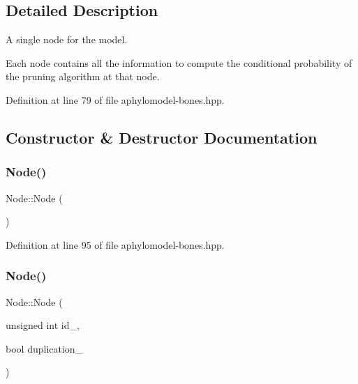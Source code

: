 

\subsection{Detailed Description}
A single node for the model. 

Each node contains all the information to compute the conditional probability of the pruning algorithm at that node. 

Definition at line 79 of file aphylomodel-\/bones.\+hpp.



\subsection{Constructor \& Destructor Documentation}
\mbox{\label{class_node_ad7a34779cad45d997bfd6d3d8043c75f}} 
\subsubsection{\texorpdfstring{Node()}{Node()}\hspace{0.1cm}{\footnotesize\ttfamily [1/3]}}
{\footnotesize\ttfamily Node\+::\+Node (\begin{DoxyParamCaption}{ }\end{DoxyParamCaption})\hspace{0.3cm}{\ttfamily [inline]}}



Definition at line 95 of file aphylomodel-\/bones.\+hpp.

\mbox{\label{class_node_affbe0c59bdcfd5e8068d50b49742cff6}} 
\subsubsection{\texorpdfstring{Node()}{Node()}\hspace{0.1cm}{\footnotesize\ttfamily [2/3]}}
{\footnotesize\ttfamily Node\+::\+Node (\begin{DoxyParamCaption}\item[{unsigned int}]{id\+\_\+,  }\item[{bool}]{duplication\+\_\+ }\end{DoxyParamCaption})\hspace{0.3cm}{\ttfamily [inline]}}



